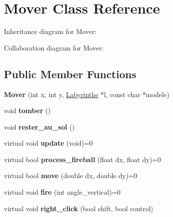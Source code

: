 \hypertarget{classMover}{}\section{Mover Class Reference}
\label{classMover}


Inheritance diagram for Mover\+:


Collaboration diagram for Mover\+:
\subsection*{Public Member Functions}
\begin{DoxyCompactItemize}
\item 
\mbox{\label{classMover_a19c916be0b9f7d6beda92bb04aa338bb}} 
{\bfseries Mover} (int x, int y, \hyperlink{classLabyrinthe}{Labyrinthe} $\ast$l, const char $\ast$modele)
\item 
\mbox{\label{classMover_afc87cc38041a7ccc2a0129d33b0b2a6a}} 
void {\bfseries tomber} ()
\item 
\mbox{\label{classMover_a05ac684f0ace96b717bb9aa016671e8e}} 
void {\bfseries rester\+\_\+au\+\_\+sol} ()
\item 
\mbox{\label{classMover_a77684ae3483af98c82c9488ef3e80f05}} 
virtual void {\bfseries update} (void)=0
\item 
\mbox{\label{classMover_a6d794056f34e2348d32ae4ff49326070}} 
virtual bool {\bfseries process\+\_\+fireball} (float dx, float dy)=0
\item 
\mbox{\label{classMover_a2e1858e5c93ddaa85ff7b446ad403b79}} 
virtual bool {\bfseries move} (double dx, double dy)=0
\item 
\mbox{\label{classMover_a670fb72f8e496de3420b89c84def7418}} 
virtual void {\bfseries fire} (int angle\+\_\+vertical)=0
\item 
\mbox{\label{classMover_ac32ed126c01d60c6df0090dd590b70b2}} 
virtual void {\bfseries right\+\_\+click} (bool shift, bool control)
\end{DoxyCompactItemize}
